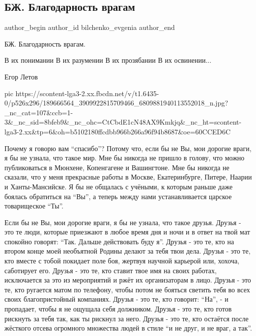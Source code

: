  
 
 
 
 
 
\subsection{БЖ. Благодарность врагам}
\label{sec:21_05_2021.fb.bilchenko_evgenia.1.vragi_blagodarnost}
\ifcmt
 author_begin
   author_id bilchenko_evgenia
 author_end
\fi

БЖ. Благодарность врагам.

В их понимании
В их разумении
В их прозябании
В их освинении...

Егор Летов


\ifcmt
  pic https://scontent-lga3-2.xx.fbcdn.net/v/t1.6435-0/p526x296/189666564_3909922815709466_6809881940113552018_n.jpg?_nc_cat=107&ccb=1-3&_nc_sid=8bfeb9&_nc_ohc=CtCbdE1cN48AX9Kmkjq&_nc_ht=scontent-lga3-2.xx&tp=6&oh=b5102180ffcdbb966b266a96f94b8687&oe=60CCED6C
\fi


Почему я говорю вам \enquote{спасибо}? Потому что, если бы не Вы, мои дорогие враги, я
бы не узнала, что такое мир. Мне бы никогда не пришло в голову, что можно
публиковаться в Мюнхене, Копенгагене и Вашингтоне. Мне бы никогда не сказали,
что у меня прекрасные работы в Москве, Екатеринбурге, Питере, Наарии и
Ханты-Мансийске. Я бы не общалась с учёными, к которым раньше даже боялась
обратиться на \enquote{Вы}, а теперь между нами устанавливается царское товарищеское
\enquote{Ты}.

Если бы не Вы, мои дорогие враги, я бы не узнала, что такое друзья. Друзья -
это те люди, которые приезжают в любое время дня и ночи и в ответ на твой мат
спокойно говорят: \enquote{Так. Дальше действовать буду я}. Друзья - это те, кто на
втором конце моей необъятной Родины делают за тебя твои дела. Друзья - это те,
кто вместе с тобой покидает поле боя, жертвуя научной карьерой или, хохоча,
саботирует его. Друзья - это те, кто ставит твое имя на своих работах,
исключается за это из мероприятий и ржёт их организаторам в лицо. Друзья - это
те, кто ругается матом по телефону, чтобы потом не бояться светить тебя во всех
своих благопристойный компаниях. Друзья - это те, кто говорит: \enquote{На}, - и
пропадает, чтобы я не ощущала себя должником. Друзья - это те, кто готов
рискнуть за тебя так, как ты рискнул за него. Друзья - это те, кто остаётся
после жёсткого отсева огромного множества людей в стиле \enquote{и не друг, и не враг,
а так}.

